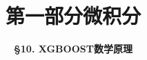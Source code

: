 




\title[Calculus]{\LARGE \bfseries 第一部分\quad 微积分} %
\author[Mathematical Foundations of XGBOOST] %
{\Large \bfseries \S 10. XGBOOST数学原理
}
\date{}



\begin{frame}
\titlepage %
\end{frame}




